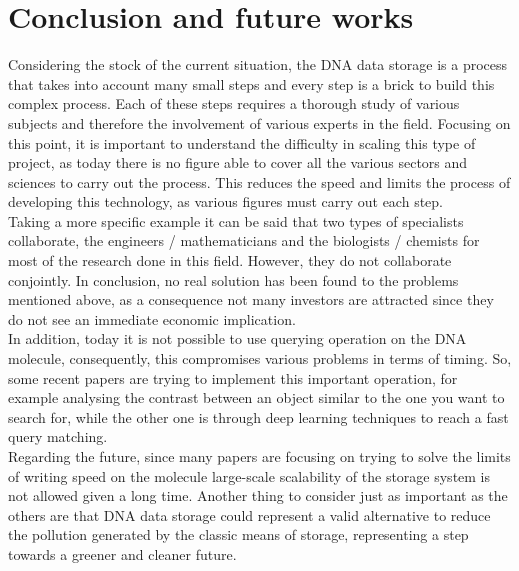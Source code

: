\documentclass[10pt,twocolumn,twoside]{gsajnl}
\theoremstyle{definition}
\begin{document}
\section{Conclusion and future works}
\label{Conclusion}
Considering the stock of the current situation, the DNA data storage is a process that takes into account many small steps and every step is a brick to build this complex process. Each of these steps requires a thorough study of various subjects and therefore the involvement of various experts in the field. Focusing on this point, it is important to understand the difficulty in scaling this type of project, as today there is no figure able to cover all the various sectors and sciences to carry out the process. This reduces the speed and limits the process of developing this technology, as various figures must carry out each step.
\\
Taking a more specific example it can be said that two types of specialists collaborate, the engineers / mathematicians and the biologists / chemists for most of the research done in this field. However, they do not collaborate conjointly. In conclusion, no real solution has been found to the problems mentioned above, as a consequence not many investors are attracted since they do not see an immediate economic implication.
\\
In addition, today it is not possible to use querying operation on the DNA molecule, consequently, this compromises various problems in terms of timing. So, some recent papers are trying to implement this important operation, for example analysing the contrast between an object similar to the one you want to search for, while the other one is through deep learning techniques to reach a fast query matching.
\\
Regarding the future, since many papers are focusing on trying to solve the limits of writing speed on the molecule large-scale scalability of the storage system is not allowed given a long time. Another thing to consider just as important as the others are that DNA data storage could represent a valid alternative to reduce the pollution generated by the classic means of storage, representing a step towards a greener and cleaner future.



\end{document}
